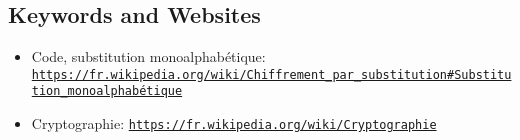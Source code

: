 \documentclass[a4paper,11pt]{report}
\newcommand{\BrochureUrlText}[1]{\texttt{#1}}
\begin{document}
{\raggedright

\subsection*{Keywords and Websites}

\begin{itemize}
  \item Code, substitution monoalphabétique: \href{https://fr.wikipedia.org/wiki/Chiffrement_par_substitution\#Substitution_monoalphab\%C3\%A9tique}{\BrochureUrlText{https://fr.wikipedia.org/wiki/Chiffrement\_par\_substitution\#Substitution\_monoalphabétique}}
  \item Cryptographie: \href{https://fr.wikipedia.org/wiki/Cryptographie}{\BrochureUrlText{https://fr.wikipedia.org/wiki/Cryptographie}}
\end{itemize}


}
\end{document}
